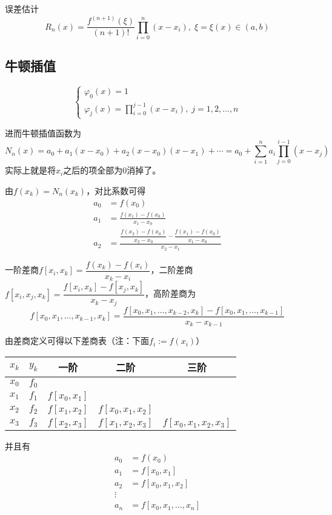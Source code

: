 误差估计
\[R_n(x)=\frac{f^{(n+1)}(\xi)}{(n+1)!}\prod_{i=0}^n(x-x_i),\;\xi=\xi(x)\in(a,b)\]

\subsection{牛顿插值}
\begin{definition}[牛顿插值基函数]
\[\begin{cases}
\varphi_0(x)=1\\
\varphi_j(x)=\displaystyle\prod_{i=0}^{j-1}(x-x_i),\;j=1,2,\ldots,n
\end{cases}\]
\end{definition}
\par 进而牛顿插值函数为
\[N_n(x)=a_0+a_1(x-x_0)+a_2(x-x_0)(x-x_1)+\cdots=a_0+\sum_{i=1}^na_i\prod_{j=0}^{i-1}(x-x_j)\]
实际上就是将$x_i$之后的项全部为$0$消掉了。
\par 由$f(x_k)=N_n(x_k)$，对比系数可得
\[\begin{aligned}
a_0 &=f(x_0)\\
a_1 &=\frac{f(x_1)-f(x_0)}{x_1-x_0}\\
a_2 &=\frac{\dfrac{f(x_2)-f(x_0)}{x_2-x_0}-\dfrac{f(x_1)-f(x_0)}{x_1-x_0}}{x_2-x_1}
\end{aligned}\]

\begin{definition}[差商]
一阶差商$f[x_i,x_k]=\dfrac{f(x_k)-f(x_i)}{x_k-x_i}$，二阶差商$f[x_i,x_j,x_k]=\dfrac{f[x_i,x_k]-f[x_j,x_k]}{x_k-x_j}$，高阶差商为
\[f[x_0,x_1,\ldots,x_{k-1},x_k]=\frac{f[x_0,x_1,\ldots,x_{k-2},x_k]-f[x_0,x_1,\ldots,x_{k-1}]}{x_k-x_{k-1}}\]
\end{definition}
由差商定义可得以下差商表（注：下面$f_i:=f(x_i)$）
\begin{center}
\begin{tabular}{ccccc}\hline
$x_k$ & $y_k$ & 一阶 & 二阶 & 三阶\\\hline
$x_0$ & $f_0$ & & &\\
$x_1$ & $f_1$ & $f[x_0,x_1]$ & &\\
$x_2$ & $f_2$ & $f[x_1,x_2]$ & $f[x_0,x_1,x_2]$ &\\
$x_3$ & $f_3$ & $f[x_2,x_3]$ & $f[x_1,x_2,x_3]$ & $f[x_0,x_1,x_2,x_3]$ \\\hline
\end{tabular}
\end{center}
并且有
\[\begin{aligned}
a_0&=f(x_0)\\
a_1&=f[x_0,x_1]\\
a_2&=f[x_0,x_1,x_2]\\
\vdots\\
a_n&=f[x_0,x_1,\ldots,x_n]
\end{aligned}\]

